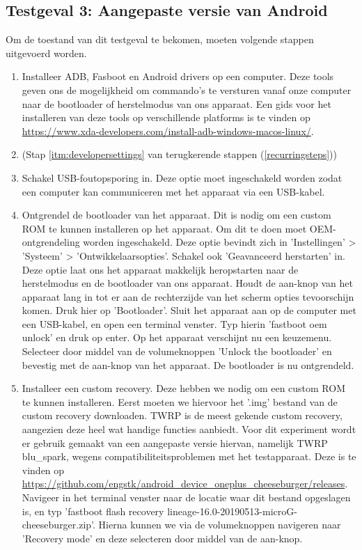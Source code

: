 \subsection{Testgeval 3: Aangepaste versie van Android}

Om de toestand van dit testgeval te bekomen, moeten volgende stappen uitgevoerd worden.

\begin{enumerate}
    \item Installeer ADB, Fasboot en Android drivers op een computer. Deze tools geven ons de mogelijkheid om commando's te versturen vanaf onze computer naar de bootloader of herstelmodus van ons apparaat. Een gids voor het installeren van deze tools op verschillende platforms is te vinden op \url{https://www.xda-developers.com/install-adb-windows-macos-linux/}.
    
    \item 
     (Stap \ref{itm:developersettings} van terugkerende stappen (\ref{recurringsteps}))
    
    \item Schakel USB-foutopsporing in. Deze optie moet ingeschakeld worden zodat een computer kan communiceren met het apparaat via een USB-kabel.
    
    \item Ontgrendel de bootloader van het apparaat. Dit is nodig om een custom ROM te kunnen installeren op het apparaat. Om dit te doen moet OEM-ontgrendeling worden ingeschakeld. Deze optie bevindt zich in 'Instellingen' > 'Systeem' > 'Ontwikkelaarsopties'. Schakel ook 'Geavanceerd herstarten' in. Deze optie laat ons het apparaat makkelijk heropstarten naar de herstelmodus en de bootloader van ons apparaat. Houdt de aan-knop van het apparaat lang in tot er aan de rechterzijde van het scherm opties tevoorschijn komen. Druk hier op 'Bootloader'. Sluit het apparaat aan op de computer met een USB-kabel, en open een terminal venster. Typ hierin 'fastboot oem unlock' en druk op enter. Op het apparaat verschijnt nu een keuzemenu. Selecteer door middel van de volumeknoppen 'Unlock the bootloader' en bevestig met de aan-knop van het apparaat. De bootloader is nu ontgrendeld.
    
    \item 
    Installeer een custom recovery. Deze hebben we nodig om een custom ROM te kunnen installeren. Eerst moeten we hiervoor het '.img' bestand van de custom recovery downloaden. TWRP is de meest gekende custom recovery, aangezien deze heel wat handige functies aanbiedt. Voor dit experiment wordt er gebruik gemaakt van een aangepaste versie hiervan, namelijk TWRP blu\_spark, wegens compatibiliteitsproblemen met het testapparaat. Deze is te vinden op \url{https://github.com/engstk/android_device_oneplus_cheeseburger/releases}. Navigeer in het terminal venster naar de locatie waar dit bestand opgeslagen is, en typ 'fastboot flash recovery lineage-16.0-20190513-microG-cheeseburger.zip'. Hierna kunnen we via de volumeknoppen navigeren naar 'Recovery mode' en deze selecteren door middel van de aan-knop.
    

\end{enumerate}
